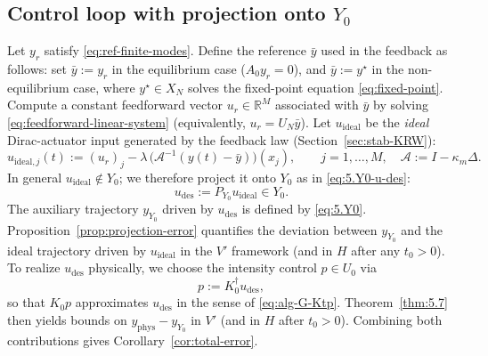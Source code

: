 \documentclass[11pt,a4paper]{article}
\numberwithin{equation}{section}
\theoremstyle{definition}
\newcommand{\R}{\mathbb{R}}
\newcommand{\1}{\mathbbm{1}}
\begin{document}
\subsection{Control loop with projection onto $Y_0$}
\label{subsec:alg-loop}
\noindent
Let $y_r$ satisfy \eqref{eq:ref-finite-modes}. Define the reference $\bar y$ used in the feedback as follows:
set $\bar y:=y_r$ in the equilibrium case ($A_0y_r=0$), and $\bar y:=y^\star$ in the non-equilibrium case,
where $y^\star\in X_N$ solves the fixed-point equation \eqref{eq:fixed-point}.
Compute a constant feedforward vector $u_r\in\R^M$ associated with $\bar y$ by solving
\eqref{eq:feedforward-linear-system} (equivalently, $u_r=U_N\bar y$).
\noindent
Let $u_{\mathrm{ideal}}$ be the \emph{ideal} Dirac-actuator input generated by the feedback law
(Section~\ref{sec:stab-KRW}):
\begin{equation}
\label{eq:alg-u-ideal}
u_{\mathrm{ideal},j}(t) := (u_r)_j -\lambda\,\big(\mathcal A^{-1}(y(t)-\bar y)\big)(x_j),
\qquad j=1,\dots,M,\quad \mathcal A:=I-\kappa_m\Delta.
\end{equation}
In general $u_{\mathrm{ideal}}\notin Y_0$; we therefore project it onto $Y_0$ as in \eqref{eq:5.Y0-u-des}:
\begin{equation}
\label{eq:alg-u-des}
u_{\mathrm{des}} := P_{Y_0} u_{\mathrm{ideal}} \in Y_0.
\end{equation}
The auxiliary trajectory $y_{Y_0}$ driven by $u_{\mathrm{des}}$ is defined by \eqref{eq:5.Y0}.
Proposition~\ref{prop:projection-error} quantifies the deviation between $y_{Y_0}$ and the ideal trajectory driven by $u_{\mathrm{ideal}}$ in the $V'$ framework (and in $H$ after any $t_0>0$).
\noindent
To realize $u_{\mathrm{des}}$ physically, we choose the intensity control $p\in U_0$ via
\begin{equation}
\label{eq:alg-p-Kdagger}
p := K_0^\dagger u_{\mathrm{des}},
\end{equation}
so that $K_0 p$ approximates $u_{\mathrm{des}}$ in the sense of \eqref{eq:alg-G-Ktp}.
Theorem~\ref{thm:5.7} then yields bounds on $y_{\mathrm{phys}}-y_{Y_0}$ in $V'$ (and in $H$ after $t_0>0$).
Combining both contributions gives Corollary~\ref{cor:total-error}.

\medskip
\end{document}
